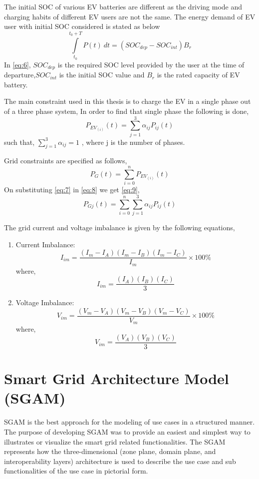 The initial SOC of various EV batteries are different as the driving mode and charging habits of different EV users are not the same. The energy demand of EV user with initial SOC considered is stated as below
\[\int\limits_{t_0}^{t_0+T} P(t) \ dt = ({SOC_{dep}}-{SOC_{int}}){B_r}\tag{6} \label{eq:6}\]
In \eqref{eq:6}, \({SOC_{dep}}\) is the required SOC level provided by the user at the time of departure,\({SOC_{int}}\) is the initial SOC value and \({B_r}\) is the rated capacity of EV battery.

The main constraint used in this thesis is to charge the EV in a single phase out of a three phase system, In order to find that single phase the following is done,
\[{P_{EV_{(i)}}(t)} = \sum \limits_{j=1}^{3} \alpha_{ij} {P_{ij}(t)}\tag{7} \label{eq:7}\]
such that, \(\sum \limits_{j=1}^{3} \alpha_{ij} = 1\) , where j is the number of phases.

Grid constraints are specified as follows,
\[{P_{G}(t)} = \sum \limits_{i=0}^{n} {P_{EV_{(i)}}(t)}\tag{8} \label{eq:8}\]
On substituting \eqref{eq:7} in \eqref{eq:8} we get \eqref{eq:9},
\[{P_{Gj}(t)} = \sum \limits_{i=0}^{n} \sum \limits_{j=1}^{3} \alpha_{ij} {P_{ij}(t)} \tag{9} \label{eq:9}\]

The grid current and voltage imbalance is given by the following equations,
\begin{enumerate}
\item Current Imbalance:
\[I_{im} = \frac {(I_{m} - I_{A}) (I_{m} - I_{B}) (I_{m} - I_{C})} {I_{m}} \times 100\% \tag{10} \label{eq:10} \]
where, \[I_{im} = \frac {(I_{A}) (I_{B}) (I_{C})}
{3}\]
\item Voltage Imbalance:
\[V_{im} = \frac {(V_{m} - V_{A}) (V_{m} - V_{B}) (V_{m} - V_{C})} {V_{m}} \times 100\% \tag{10} \label{eq:10} \]
where, \[V_{im} = \frac {(V_{A}) (V_{B}) (V_{C})}
{3}\]
\end{enumerate}


\chapter{Smart Grid Architecture Model (SGAM)}\label{chap:Smart Grid Architecture Model (SGAM)}
SGAM is the best approach for the modeling of use cases in a structured manner. The purpose
of developing SGAM was to provide an easiest and simplest way to illustrates or visualize the
smart grid related functionalities. The SGAM represents how the three-dimensional (zone plane,
domain plane, and interoperability layers) architecture is used to describe the use case and sub
functionalities of the use case in pictorial form.

